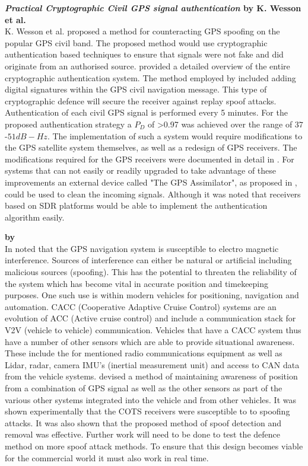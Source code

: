 \medskip

\textbf{\emph{Practical Cryptographic Civil GPS signal authentication} by K. Wesson et al.} \\
K. Wesson et al. \cite{RN13} proposed a method for counteracting GPS spoofing on the popular GPS civil band. The proposed method would use cryptographic
authentication based techniques to ensure that signals were not fake and did originate from an authorised source.
\citeauthor{RN13} provided a detailed overview of the entire cryptographic authentication system.
The method employed by \citeauthor{RN13} included adding digital signatures within the GPS civil navigation message. This type of cryptographic defence
will secure the receiver against replay spoof attacks. Authentication of each civil GPS signal is performed every 5 minutes.
For the proposed authentication strategy a $P_D$ of >0.97 was achieved over the range of $37$-$51 dB-Hz$.
The implementation of such a system would require modifications to the GPS satellite system themselves, as well as a redesign of GPS receivers.
The modifications required for the GPS receivers were documented in detail in \cite{RN13}. For systems that can not easily or readily upgraded to
take advantage of these improvements an external device called "The GPS Assimilator", as proposed in \cite{RN19}, could be used to clean the incoming
signals.
Although it was noted that receivers based on SDR platforms would be able to implement the authentication algorithm easily.

\medskip

\textbf{\emph{} by \citeauthor{RN17}} \\
In \citeyear{RN17} \citeauthor{RN17} \cite{RN17} noted that the GPS navigation system is susceptible to electro magnetic interference. Sources of interference 
can either be natural or artificial including malicious sources (spoofing). This has the potential to threaten the reliability of the system which has become 
vital in accurate position and timekeeping purposes. One such use is within modern vehicles for positioning, navigation and automation. 
CACC (Cooperative Adaptive Cruise Control) systems are an evolution of ACC (Active cruise control) and include a communication stack for V2V (vehicle to vehicle) communication. 
Vehicles that have a CACC system thus have a number of other sensors which are able to provide situational awareness. These include the for mentioned radio
communications equipment as well as Lidar, radar, camera  IMU's (inertial measurement unit) and access to CAN data from the vehicle systems.
\citeauthor{RN17} devised a method of maintaining awareness of position from a combination of GPS signal as well as the other sensors as part of
the various other systems integrated into the vehicle and from other vehicles. It was shown experimentally that the COTS receivers were susceptible to
to spoofing attacks. It was also shown that the proposed method of spoof detection and removal was effective. Further work will need to be done
to test the defence method on more spoof attack methods. To ensure that this design becomes viable for the commercial world it must also work in real time.

